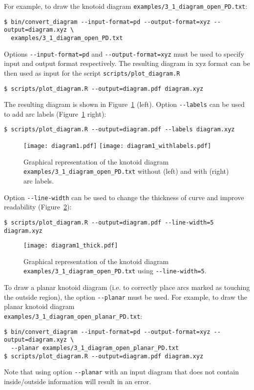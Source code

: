 For example, to draw the knotoid diagram \lstinline{examples/3_1_diagram_open_PD.txt}:
\begin{lstlisting}
$ bin/convert_diagram --input-format=pd --output-format=xyz --output=diagram.xyz \
  examples/3_1_diagram_open_PD.txt
\end{lstlisting}
Options \lstinline{--input-format=pd} and \lstinline{--output-format=xyz} must be used to specify input and output format respectively. The resulting diagram in xyz format can be then used as input for the  script \lstinline{scripts/plot_diagram.R}
\begin{lstlisting}
$ scripts/plot_diagram.R --output=diagram.pdf diagram.xyz
\end{lstlisting}
The resulting diagram is shown in Figure~\ref{fig:diagram1} (left). Option \lstinline{--labels} can be used to add arc labels (Figure~\ref{fig:diagram1} right):
\begin{lstlisting}
$ scripts/plot_diagram.R --output=diagram.pdf --labels diagram.xyz
\end{lstlisting}
\begin{figure}[t]
\centering
\texttt{[image: diagram1.pdf]}
\texttt{[image: diagram1\_withlabels.pdf]}
\caption{Graphical representation of the knotoid diagram \lstinline{examples/3_1_diagram_open_PD.txt} without (left) and with (right) arc labels.}\label{fig:diagram1}
\end{figure}
Option \lstinline{--line-width} can be used to change the thickness of curve and improve readability (Figure~\ref{fig:diagram1thick}):
\begin{lstlisting}
$ scripts/plot_diagram.R --output=diagram.pdf --line-width=5 diagram.xyz
\end{lstlisting}
\begin{figure}[t]
\centering
\texttt{[image: diagram1\_thick.pdf]}
\caption{Graphical representation of the knotoid diagram \lstinline{examples/3_1_diagram_open_PD.txt} using \lstinline{--line-width=5}.}\label{fig:diagram1thick}
\end{figure}

To draw a planar knotoid diagram (i.e. to correctly place arcs marked as touching the outside region), the option \lstinline{--planar} must be used. For example, to draw the planar knotoid diagram\\
\lstinline{examples/3_1_diagram_open_planar_PD.txt}:
\begin{lstlisting}
$ bin/convert_diagram --input-format=pd --output-format=xyz --output=diagram.xyz \
  --planar examples/3_1_diagram_open_planar_PD.txt
$ scripts/plot_diagram.R --output=diagram.pdf diagram.xyz
\end{lstlisting}
Note that using option \lstinline{--planar} with an input diagram that does not contain inside/outside information will result in an error.

